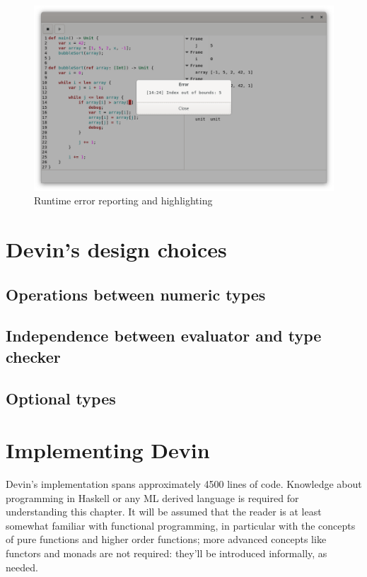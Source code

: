 \documentclass[11pt, american, draft]{PhdThesis}
\begin{document}
  \begin{figure}[H]
    \center
    \includegraphics[width=0.9\linewidth]{6.png}
    \caption{Runtime error reporting and highlighting}
  \end{figure}

  \chapter{Devin's design choices}

  \section{Operations between numeric types}

  \section{Independence between evaluator and type checker}

  \section{Optional types}

  \chapter{Implementing Devin}

  Devin's implementation spans approximately 4500 lines of code. Knowledge about programming in
  Haskell or any ML derived language is required for understanding this chapter. It will be assumed
  that the reader is at least somewhat familiar with functional programming, in particular with the
  concepts of pure functions and higher order functions; more advanced concepts like functors and
  monads are not required: they'll be introduced informally, as needed.
\end{document}
